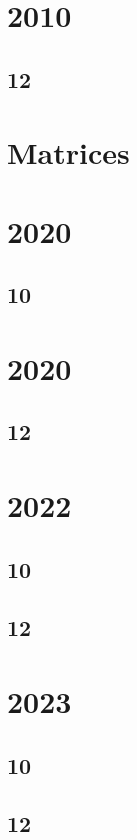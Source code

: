 \section{2010}
\subsection{12}





\section{Matrices}
\section{2020}
\subsection{10}

\section{2020}
\subsection{12}

\section{2022}
\subsection{10}

\subsection{12}

\section{2023}
\subsection{10}

\subsection{12}

